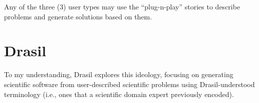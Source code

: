 Any of the three (3) user types may use the ``plug-n-play'' stories to describe
problems and generate solutions based on them.

\section{Drasil}
\label{chap:ideology:sec:drasil}

To my understanding, Drasil \cite{Drasil2021} explores this ideology, focusing
on generating scientific software from user-described scientific problems using
Drasil-understood terminology (i.e., ones that a scientific domain expert
previously encoded).
